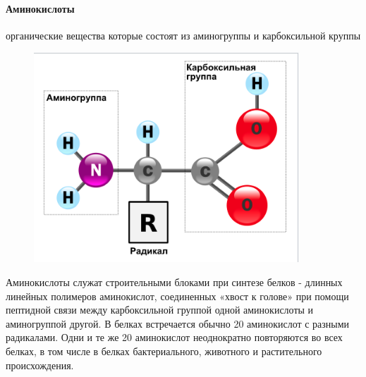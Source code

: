 \documentclass[a4paper, 12pt]{article}
\begin{document}
	\paragraph{Аминокислоты} органические вещества которые состоят из аминогруппы и карбоксильной круппы
	\begin{figure}[H]
		\centering
		\includegraphics[scale= 0.7]{2amin}
	\end{figure}
Аминокислоты служат строительными блоками при синтезе белков
- длинных линейных полимеров аминокислот, соединенных «хвост к голове» при
помощи пептидной связи между карбоксильной группой одной аминокислоты и
аминогруппой другой. В белках встречается обычно 20 аминокислот с
разными радикалами. Одни и те
же 20 аминокислот неоднократно повторяются во всех белках, в том числе в белках
бактериального, животного и растительного происхождения.
\end{document}
